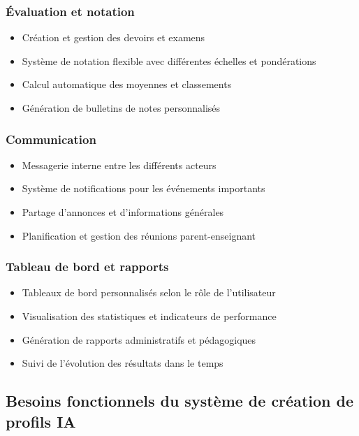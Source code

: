 \subsubsection{Évaluation et notation}

\begin{itemize}
  \item Création et gestion des devoirs et examens
  \item Système de notation flexible avec différentes échelles et pondérations
  \item Calcul automatique des moyennes et classements
  \item Génération de bulletins de notes personnalisés
\end{itemize}

\subsubsection{Communication}

\begin{itemize}
  \item Messagerie interne entre les différents acteurs
  \item Système de notifications pour les événements importants
  \item Partage d'annonces et d'informations générales
  \item Planification et gestion des réunions parent-enseignant
\end{itemize}

\subsubsection{Tableau de bord et rapports}

\begin{itemize}
  \item Tableaux de bord personnalisés selon le rôle de l'utilisateur
  \item Visualisation des statistiques et indicateurs de performance
  \item Génération de rapports administratifs et pédagogiques
  \item Suivi de l'évolution des résultats dans le temps
\end{itemize}

\subsection{Besoins fonctionnels du système de création de profils IA}


